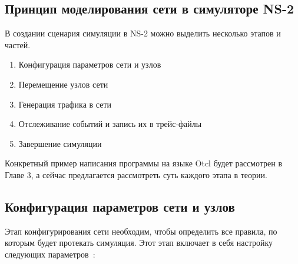 \subsection*{Принцип моделирования сети в симуляторе NS-2}

В создании сценария симуляции в NS-2 можно выделить несколько этапов и частей.

\begin{enumerate}
  \item Конфигурация параметров сети и узлов
  \item Перемещение узлов сети
  \item Генерация трафика в сети
  \item Отслеживание событий и запись их в трейс-файлы
  \item Завершение симуляции
\end{enumerate}

Конкретный пример написания программы на языке Otcl будет рассмотрен в Главе 3, а сейчас предлагается рассмотреть суть каждого этапа в теории.

\subsection*{Конфигурация параметров сети и узлов}

Этап конфигурирования сети необходим, чтобы определить все правила, по которым будет протекать симуляция. Этот этап включает в себя настройку следующих параметров~\cite{ns2_docs}:

